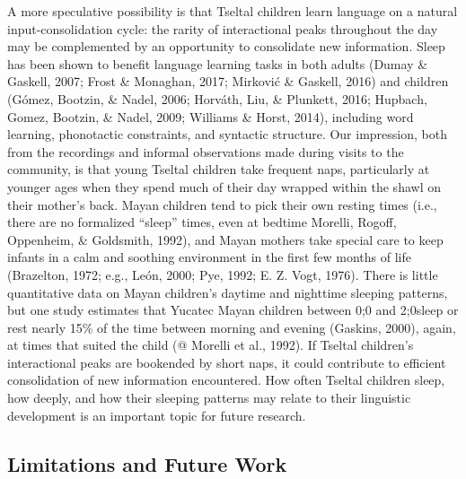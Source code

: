 \documentclass[floatsintext,man]{apa6}
\theoremstyle{definition}
\theoremstyle{definition}
\theoremstyle{definition}
\theoremstyle{remark}
\begin{document}
A more speculative possibility is that Tseltal children learn language
on a natural input-consolidation cycle: the rarity of interactional
peaks throughout the day may be complemented by an opportunity to
consolidate new information. Sleep has been shown to benefit language
learning tasks in both adults (Dumay \& Gaskell, 2007; Frost \&
Monaghan, 2017; Mirković \& Gaskell, 2016) and children (Gómez, Bootzin,
\& Nadel, 2006; Horváth, Liu, \& Plunkett, 2016; Hupbach, Gomez,
Bootzin, \& Nadel, 2009; Williams \& Horst, 2014), including word
learning, phonotactic constraints, and syntactic structure. Our
impression, both from the recordings and informal observations made
during visits to the community, is that young Tseltal children take
frequent naps, particularly at younger ages when they spend much of
their day wrapped within the shawl on their mother's back. Mayan
children tend to pick their own resting times (i.e., there are no
formalized ``sleep'' times, even at bedtime Morelli, Rogoff, Oppenheim,
\& Goldsmith, 1992), and Mayan mothers take special care to keep infants
in a calm and soothing environment in the first few months of life
(Brazelton, 1972; e.g., León, 2000; Pye, 1992; E. Z. Vogt, 1976). There
is little quantitative data on Mayan children's daytime and nighttime
sleeping patterns, but one study estimates that Yucatec Mayan children
between 0;0 and 2;0sleep or rest nearly 15\% of the time between morning
and evening (Gaskins, 2000), again, at times that suited the child (@
Morelli et al., 1992). If Tseltal children's interactional peaks are
bookended by short naps, it could contribute to efficient consolidation
of new information encountered. How often Tseltal children sleep, how
deeply, and how their sleeping patterns may relate to their linguistic
development is an important topic for future research.

\subsection{Limitations and Future Work}\label{disc-limfut}
\end{document}

